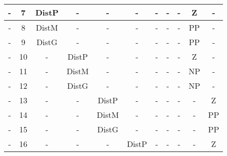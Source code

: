 \begin{table}[ht]
{\begin{tabular}{|c|c|c|c|c|c|c|c|c|c|c|}
-                                                                               & 7                 & DistP          & -              & -              & -              & -              & -      & -      & Z          & -          \\ \hline
-                                                                               & 8                 & DistM          & -              & -              & -              & -              & -      & -      & PP         & -          \\ \hline
-                                                                               & 9                 & DistG          & -              & -              & -              & -              & -      & -      & PP         & -          \\ \hline
-                                                                               & 10                & -              & DistP          & -              & -              & -              & -      & -      & Z          & -          \\ \hline
-                                                                               & 11                & -              & DistM          & -              & -              & -              & -      & -      & NP         & -          \\ \hline
-                                                                               & 12                & -              & DistG          & -              & -              & -              & -      & -      & NP         & -          \\ \hline
-                                                                               & 13                & -              & -              & DistP          & -              & -              & -      & -      & -          & Z          \\ \hline
-                                                                               & 14                & -              & -              & DistM          & -              & -              & -      & -      & -          & PP         \\ \hline
-                                                                               & 15                & -              & -              & DistG          & -              & -              & -      & -      & -          & PP         \\ \hline
-                                                                               & 16                & -              & -              & -              & DistP          & -              & -      & -      & -          & Z          \\ \hline

\end{tabular}}
\end{table}
